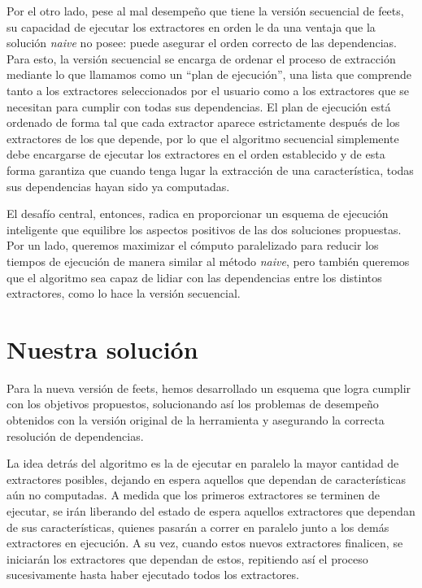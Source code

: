 Por el otro lado, pese al mal desempeño que tiene la versión secuencial de \gls{feets}, su capacidad de ejecutar los extractores en orden le da una ventaja que la solución \emph{naive} no posee: puede asegurar el orden correcto de las dependencias. Para esto, la versión secuencial se encarga de ordenar el proceso de extracción mediante lo que llamamos como un ``plan de ejecución'', una lista que comprende tanto a los extractores seleccionados por el usuario como a los extractores que se necesitan para cumplir con todas sus dependencias. El plan de ejecución está ordenado de forma tal que cada extractor aparece estrictamente después de los extractores de los que depende, por lo que el algoritmo secuencial simplemente debe encargarse de ejecutar los extractores en el orden establecido y de esta forma garantiza que cuando tenga lugar la extracción de una característica, todas sus dependencias hayan sido ya computadas.

El desafío central, entonces, radica en proporcionar un esquema de ejecución inteligente que equilibre los aspectos positivos de las dos soluciones propuestas. Por un lado, queremos maximizar el cómputo paralelizado para reducir los tiempos de ejecución de manera similar al método \emph{naive}, pero también queremos que el algoritmo sea capaz de lidiar con las dependencias entre los distintos extractores, como lo hace la versión secuencial.

\section{Nuestra solución}

Para la nueva versión de \gls{feets}, hemos desarrollado un esquema que logra cumplir con los objetivos propuestos, solucionando así los problemas de desempeño obtenidos con la versión original de la herramienta y asegurando la correcta resolución de dependencias.

La idea detrás del algoritmo es la de ejecutar en paralelo la mayor cantidad de extractores posibles, dejando en espera aquellos que dependan de características aún no computadas. A medida que los primeros extractores se terminen de ejecutar, se irán liberando del estado de espera aquellos extractores que dependan de sus características, quienes pasarán a correr en paralelo junto a los demás extractores en ejecución. A su vez, cuando estos nuevos extractores finalicen, se iniciarán los extractores que dependan de estos, repitiendo así el proceso sucesivamente hasta haber ejecutado todos los extractores.

